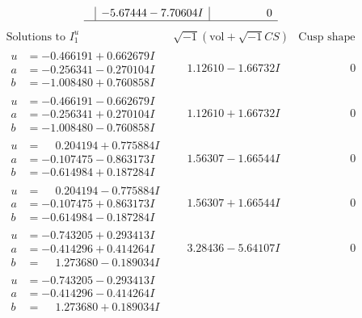 \documentclass[1p]{elsarticle_modified}
\theoremstyle{definition}
\newcommand{\I}{\sqrt{-1}}
\begin{document}
$$\begin{array}{c|c|c}
 & -5.67444 - 7.70604 I & \phantom{-0.000000 } 0\\
 \hline 
 \end{array}$$\newpage$$\begin{array}{c|c|c}  
\text{Solutions to }I^u_{1}& \I (\text{vol} + \sqrt{-1}CS) & \text{Cusp shape}\\
 \hline 
\begin{aligned}
u &= -0.466191 + 0.662679 I \\
a &= -0.256341 - 0.270104 I \\
b &= -1.008480 + 0.760858 I\end{aligned}
 & \phantom{-}1.12610 - 1.66732 I & \phantom{-0.000000 } 0 \\ \hline\begin{aligned}
u &= -0.466191 - 0.662679 I \\
a &= -0.256341 + 0.270104 I \\
b &= -1.008480 - 0.760858 I\end{aligned}
 & \phantom{-}1.12610 + 1.66732 I & \phantom{-0.000000 } 0 \\ \hline\begin{aligned}
u &= \phantom{-}0.204194 + 0.775884 I \\
a &= -0.107475 - 0.863173 I \\
b &= -0.614984 + 0.187284 I\end{aligned}
 & \phantom{-}1.56307 - 1.66544 I & \phantom{-0.000000 } 0 \\ \hline\begin{aligned}
u &= \phantom{-}0.204194 - 0.775884 I \\
a &= -0.107475 + 0.863173 I \\
b &= -0.614984 - 0.187284 I\end{aligned}
 & \phantom{-}1.56307 + 1.66544 I & \phantom{-0.000000 } 0 \\ \hline\begin{aligned}
u &= -0.743205 + 0.293413 I \\
a &= -0.414296 + 0.414264 I \\
b &= \phantom{-}1.273680 - 0.189034 I\end{aligned}
 & \phantom{-}3.28436 - 5.64107 I & \phantom{-0.000000 } 0 \\ \hline\begin{aligned}
u &= -0.743205 - 0.293413 I \\
a &= -0.414296 - 0.414264 I \\
b &= \phantom{-}1.273680 + 0.189034 I\end{aligned}

\end{array}$$
\end{document}
